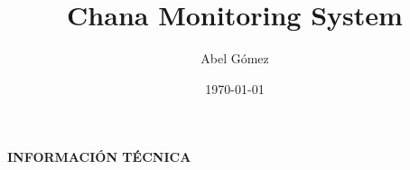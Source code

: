 \documentclass[twoside]{report}
\title{%
  Chana Monitoring System%
}
\author{
  Abel Gómez
}
\date{
  \today
}
\begin{document}
\maketitle

\tableofcontents

%








\appendix

\cleardoublepage

\thispagestyle{empty}

\vspace*{\fill}

\begin{center}
{\color{main}\headingfont\LARGE\bfseries\uppercase{INFORMACIÓN TÉCNICA}}
\end{center}

\vspace*{\fill}

\cleardoublepage








% 
% 
% 
% 
% 
% 


\makeback
\end{document}
